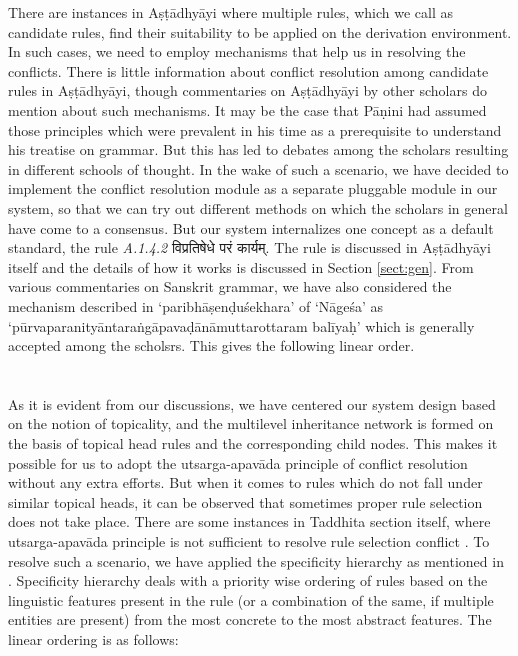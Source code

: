 \documentclass[11pt]{article}
\begin{document}
There are instances in Aṣṭādhyāyi where multiple rules, which we call as candidate rules, find their suitability to be applied on the derivation environment. In such cases, we need to employ mechanisms that help us in resolving the conflicts. There is little information about conflict resolution among candidate rules in Aṣṭādhyāyi, though commentaries on Aṣṭādhyāyi by other scholars do mention about such mechanisms. It may be the case that Pāṇini had assumed those principles which were prevalent in his time as a prerequisite to understand his treatise on grammar. But this has led to debates among the scholars resulting in different schools of thought. In the wake of such a scenario, we have decided to implement the conflict resolution module as a separate pluggable module in our system, so that we can try out different methods on which the scholars in general have come to a consensus. But our system internalizes one concept as a default standard, the rule {\sl A.1.4.2 } {\skt विप्रतिषेधे परं कार्यम्}. The rule is discussed in Aṣṭādhyāyi itself and the details of how it works is discussed in Section \ref{sect:gen}. From various commentaries on Sanskrit grammar, we have also considered the mechanism described in `paribhāṣenḍuśekhara' of `Nāgeśa' as `pūrvaparanityāntaraṅgāpavaḍānāmuttarottaram balīyaḥ' which is generally accepted among the scholsrs. This gives the following linear order.
\\
\noindent{}
\\
\\
As it is evident from our discussions, we have centered our system design based on the notion of topicality, and the multilevel inheritance network is formed on the basis of topical head rules and the corresponding child nodes. This makes it possible for us to adopt the utsarga-apavāda principle of conflict resolution without any extra efforts. But when it comes to rules which do not fall under similar topical heads, it can be observed that sometimes proper rule selection does not take place. There are some instances in Taddhita section itself, where utsarga-apavāda principle is not sufficient to resolve rule selection conflict . To resolve such a scenario, we have applied the specificity hierarchy as mentioned in . Specificity hierarchy deals with a priority wise ordering of rules based on the linguistic features present in the rule (or a combination of the same, if multiple entities are present) from the most concrete to the most abstract features. The linear ordering is as follows:
\\
\\
\noindent{}
\end{document}
